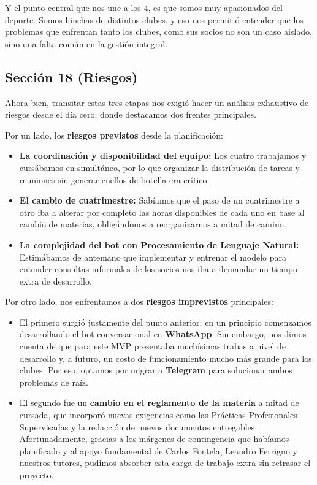 Y el punto central que nos une a los 4, es que somos muy apasionados del deporte. Somos hinchas de distintos clubes, y eso nos permitió entender que los problemas que enfrentan tanto los clubes, como sus socios no son un caso aislado, sino una falta común en la gestión integral.

\subsection{Sección 18 (Riesgos)}

Ahora bien, transitar estas tres etapas nos exigió hacer un análisis exhaustivo de riesgos desde el día cero, donde destacamos dos frentes principales.

Por un lado, los \textbf{riesgos previstos} desde la planificación:
\begin{itemize}
    \item \textbf{La coordinación y disponibilidad del equipo:} Los cuatro trabajamos y cursábamos en simultáneo, por lo que organizar la distribución de tareas y reuniones sin generar cuellos de botella era crítico.
    \item \textbf{El cambio de cuatrimestre:} Sabíamos que el paso de un cuatrimestre a otro iba a alterar por completo las horas disponibles de cada uno en base al cambio de materias, obligándonos a reorganizarnos a mitad de camino.
    \item \textbf{La complejidad del bot con Procesamiento de Lenguaje Natural:} Estimábamos de antemano que implementar y entrenar el modelo para entender consultas informales de los socios nos iba a demandar un tiempo extra de desarrollo.
\end{itemize}

Por otro lado, nos enfrentamos a dos \textbf{riesgos imprevistos} principales:
\begin{itemize}
    \item El primero surgió justamente del punto anterior: en un principio comenzamos desarrollando el bot conversacional en \textbf{WhatsApp}. Sin embargo, nos dimos cuenta de que para este MVP presentaba muchísimas trabas a nivel de desarrollo y, a futuro, un costo de funcionamiento mucho más grande para los clubes. Por eso, optamos por migrar a \textbf{Telegram} para solucionar ambos problemas de raíz.
    \item El segundo fue un \textbf{cambio en el reglamento de la materia} a mitad de cursada, que incorporó nuevas exigencias como las Prácticas Profesionales Supervisadas y la redacción de nuevos documentos entregables. Afortunadamente, gracias a los márgenes de contingencia que habíamos planificado y al apoyo fundamental de Carlos Fontela, Leandro Ferrigno y nuestros tutores, pudimos absorber esta carga de trabajo extra sin retrasar el proyecto.
\end{itemize}

